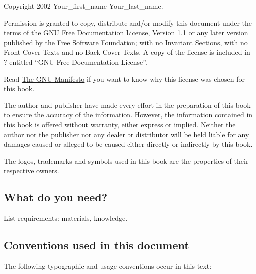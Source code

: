Copyright 2002 Your\_first\_name Your\_last\_name.

Permission is granted to copy, distribute and/or modify this document
under the terms of the GNU Free Documentation License, Version 1.1 or
any later version published by the Free Software Foundation; with no
Invariant Sections, with no Front-Cover Texts and no Back-Cover Texts. A
copy of the license is included in ? entitled ``GNU Free Documentation
License''.

Read \href{http://www.fsf.org/gnu/manifesto.html}{The GNU Manifesto} if
you want to know why this license was chosen for this book.

The author and publisher have made every effort in the preparation of
this book to ensure the accuracy of the information. However, the
information contained in this book is offered without warranty, either
express or implied. Neither the author nor the publisher nor any dealer
or distributor will be held liable for any damages caused or alleged to
be caused either directly or indirectly by this book.

The logos, trademarks and symbols used in this book are the properties
of their respective owners.

\subsection{What do you need?}\label{introux5f08}

List requirements: materials, knowledge.

\subsection{Conventions used in this document}\label{introux5f09}

The following typographic and usage conventions occur in this text:

